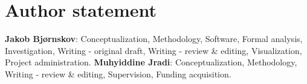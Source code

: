 \section*{Author statement}

\textbf{Jakob Bjørnskov}: Conceptualization, Methodology, Software, Formal analysis, Investigation, Writing - original draft, Writing - review \& editing, Visualization, Project administration. \textbf{Muhyiddine Jradi}: Conceptualization, Methodology, Writing - review \& editing, Supervision, Funding acquisition.